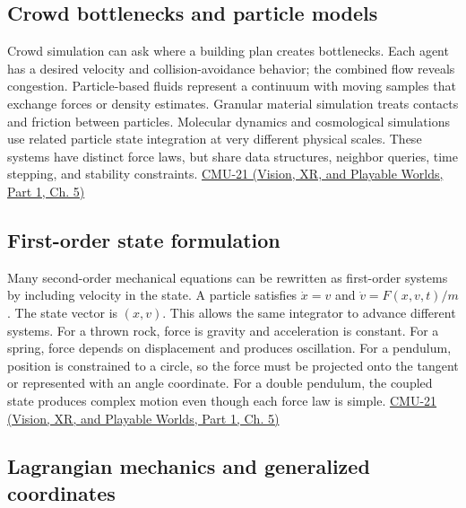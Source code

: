 \subsection{Crowd bottlenecks and particle models}\label{04-visual-computing-ii-ch029-crowd-bottlenecks-and-particle-models}

\hypertarget{04-visual-computing-ii-ch029-crowd-bottlenecks-and-particle-models}{}

Crowd simulation can ask where a building plan creates bottlenecks. Each agent has a desired velocity and collision-avoidance behavior; the combined flow reveals congestion. Particle-based fluids represent a continuum with moving samples that exchange forces or density estimates. Granular material simulation treats contacts and friction between particles. Molecular dynamics and cosmological simulations use related particle state integration at very different physical scales. These systems have distinct force laws, but share data structures, neighbor queries, time stepping, and stability constraints. \href{../07-Vision-XR-and-Playable-Worlds-P01/main.pdf\#nameddest=04-visual-computing-ii-ch036-cmu-21---dynamics-and-time-integration}{CMU-21 (Vision, XR, and Playable Worlds, Part 1, Ch. 5)}

\subsection{First-order state formulation}\label{04-visual-computing-ii-ch029-first-order-state-formulation}

\hypertarget{04-visual-computing-ii-ch029-first-order-state-formulation}{}

Many second-order mechanical equations can be rewritten as first-order systems by including velocity in the state. A particle satisfies \(\dot x=v\) and \(\dot v=F(x,v,t)/m\). The state vector is \((x,v)\). This allows the same integrator to advance different systems. For a thrown rock, force is gravity and acceleration is constant. For a spring, force depends on displacement and produces oscillation. For a pendulum, position is constrained to a circle, so the force must be projected onto the tangent or represented with an angle coordinate. For a double pendulum, the coupled state produces complex motion even though each force law is simple. \href{../07-Vision-XR-and-Playable-Worlds-P01/main.pdf\#nameddest=04-visual-computing-ii-ch036-cmu-21---dynamics-and-time-integration}{CMU-21 (Vision, XR, and Playable Worlds, Part 1, Ch. 5)}

\subsection{Lagrangian mechanics and generalized coordinates}\label{04-visual-computing-ii-ch029-lagrangian-mechanics-and-generalized-coordinates}

